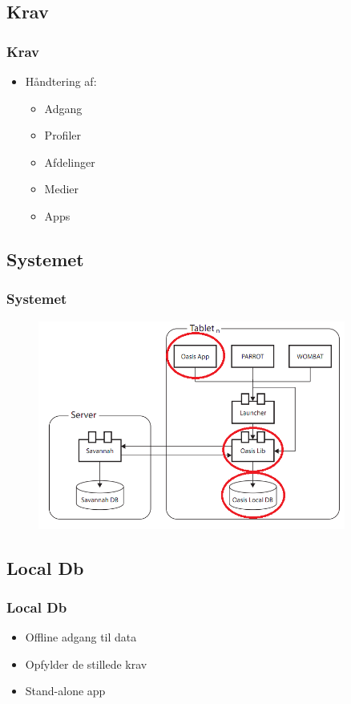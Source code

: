 \documentclass{beamer}
\begin{document}
\subsection{Krav}

\begin{frame}
	\frametitle{Krav}
	
	\begin{itemize}
		\item H\aa{}ndtering af:
		\begin{itemize}
			\item Adgang
			\item Profiler
			\item Afdelinger
			\item Medier
			\item Apps
		\end{itemize}
	\end{itemize}
\end{frame}

\subsection{Systemet}

\begin{frame}
	\frametitle{Systemet}
	\begin{figure}[!h]
		\centering
			\includegraphics[width=0.9\textwidth]{GIRAF.PNG}
		\label{fig:Giraf_comp}
	\end{figure}
\end{frame}

\subsection{Local Db}

\begin{frame}
	\frametitle{Local Db}
	
	\begin{itemize}
		\item Offline adgang til data
		\item Opfylder de stillede krav
		\item Stand-alone app
	\end{itemize}
\end{frame}
\end{document}
